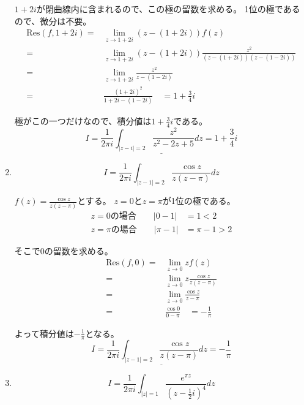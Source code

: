 \documentclass[10pt,b5paper]{ltjsarticle}
\begin{document}
\begin{enumerate}
      $1+2i$が閉曲線内に含まれるので、この極の留数を求める。
      1位の極であるので、微分は不要。
      \begin{align}
       \mathrm{Res}(f,1+2i) =& \lim_{z\rightarrow 1+2i}(z-(1+2i))f(z)\\
           =& \lim_{z\rightarrow 1+2i}(z-(1+2i))\frac{z^2}{(z-(1+2i))(z-(1-2i))}\\
           =& \lim_{z\rightarrow 1+2i}\frac{z^2}{z-(1-2i)}\\
           =& \frac{(1+2i)^2}{1+2i-(1-2i)} \quad = 1+\frac{3}{4}i
      \end{align}

      極がこの一つだけなので、積分値は$1+\frac{3}{4}i$である。
      \begin{equation}
       \underline{
        I = \frac{1}{2\pi i}\int_{\lvert z-i \rvert = 2}\frac{z^2}{z^2-2z+5}dz
        =1+\frac{3}{4}i
        }
      \end{equation}
 \hrulefill
 \item
      \begin{equation}
       I = \frac{1}{2\pi i}\int_{\lvert z-1 \rvert = 2}\frac{\cos z}{z(z-\pi)}dz
      \end{equation}

      $f(z)=\frac{\cos z}{z(z-\pi)}$とする。
      $z=0$と$z=\pi$が1位の極である。
      \begin{align}
       z=0 の場合 \qquad \lvert 0 -1 \rvert &= 1 < 2\\
       z=\pi の場合 \qquad \lvert \pi -1 \rvert &= \pi -1 > 2
      \end{align}

      そこで$0$の留数を求める。
      \begin{align}
       \mathrm{Res}(f,0) =& \lim_{z\rightarrow 0}zf(z)\\
           =& \lim_{z\rightarrow 0}z\frac{\cos z}{z(z-\pi)}\\
           =& \lim_{z\rightarrow 0}\frac{\cos z}{z-\pi}\\
           =& \frac{\cos 0}{0-\pi} \quad = -\frac{1}{\pi}
      \end{align}

      よって積分値は$-\frac{1}{\pi}$となる。
      \begin{equation}
       \underline{
        I = \frac{1}{2\pi i}\int_{\lvert z-1 \rvert = 2}\frac{\cos z}{z(z-\pi)}dz
        = -\frac{1}{\pi}
        }
      \end{equation}
 \hrulefill
 \item
      \begin{equation}
       I = \frac{1}{2\pi i}\int_{\lvert z \rvert = 1}\frac{e^{\pi z}}{(z-\frac{1}{2}i)^4}dz
      \end{equation}


\end{enumerate}
\end{document}
